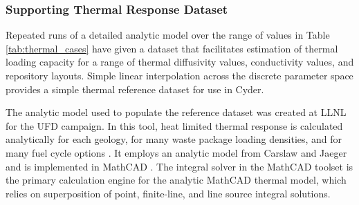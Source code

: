 \subsubsection{Supporting Thermal Response Dataset}

Repeated runs of a detailed analytic model over the range of values in Table 
\ref{tab:thermal_cases} have given a dataset that 
facilitates estimation of thermal loading capacity for a range of thermal 
diffusivity values, conductivity values, and repository layouts. Simple linear 
interpolation across the discrete parameter space provides a simple thermal 
reference dataset for use in Cyder.



The analytic model used to populate the reference dataset was created at 
\gls{LLNL} for the \gls{UFD} campaign. In this tool, heat limited thermal 
response is calculated analytically for each geology, for many waste package 
loading densities, and for many fuel cycle options \cite{hardin_generic_2011, 
greenberg_investigations_2012, greenberg_application_2012}. It employs an 
analytic model from Carslaw and Jaeger and is implemented in MathCAD 
\cite{carslaw_conduction_1959, ptc_mathcad_2010}.  The integral solver in the 
MathCAD toolset is the primary calculation engine for the analytic MathCAD 
thermal model, which relies on superposition of point, finite-line, and line 
source integral solutions.  

